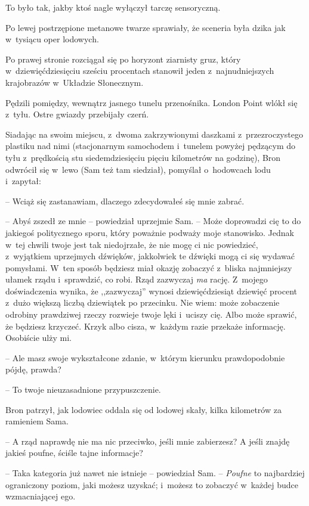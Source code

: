 \documentclass[oneside,polish,11pt,rmheadings]{mwbk}
\begin{document}
\bigskip

To było tak, jakby ktoś nagle wyłączył tarczę sensoryczną. 

Po lewej postrzępione metanowe twarze sprawiały, że sceneria była dzika jak w~tysiącu oper lodowych. 

Po prawej stronie rozciągał się po horyzont ziarnisty gruz, który w~dziewięćdziesięciu sześciu procentach stanowił jeden z~najnudniejszych krajobrazów w~Układzie Słonecznym. 

Pędzili pomiędzy, wewnątrz jasnego tunelu przenośnika. London Point wlókł się z~tyłu. Ostre gwiazdy przebijały czerń. 

Siadając na swoim miejscu, z~dwoma zakrzywionymi daszkami z~przezroczystego plastiku nad nimi (stacjonarnym samochodem i~tunelem powyżej pędzącym do tyłu z~prędkością stu siedemdziesięciu pięciu kilometrów na godzinę), Bron odwrócił się w~lewo (Sam też tam siedział), pomyślał o~hodowcach lodu i~zapytał: 

-- Wciąż się zastanawiam, dlaczego zdecydowałeś się mnie zabrać. 

-- Abyś zszedł ze mnie -- powiedział uprzejmie Sam.  -- Może doprowadzi cię to do jakiegoś politycznego sporu, który poważnie podważy moje stanowisko. Jednak w~tej chwili twoje jest tak niedojrzałe, że nie mogę ci nic powiedzieć, z~wyjątkiem uprzejmych dźwięków, jakkolwiek te dźwięki mogą ci się wydawać pomysłami. W~ten sposób będziesz miał okazję zobaczyć z~bliska najmniejszy ułamek rządu i~sprawdzić, co robi. Rząd zazwyczaj \textit{ma } rację. Z~mojego doświadczenia wynika, że ,,zazwyczaj'' wynosi dziewięćdziesiąt dziewięć procent z~dużo większą liczbą dziewiątek po przecinku. Nie wiem: może zobaczenie odrobiny prawdziwej rzeczy rozwieje twoje lęki i~uciszy cię. Albo może sprawić, że będziesz krzyczeć. Krzyk albo cisza, w~każdym razie przekaże informację. Osobiście ulży mi. 

-- Ale masz swoje wykształcone zdanie, w~którym kierunku prawdopodobnie pójdę, prawda? 

-- To twoje nieuzasadnione przypuszczenie. 

Bron patrzył, jak lodowiec oddala się od lodowej skały, kilka kilometrów za ramieniem Sama. 

-- A rząd naprawdę nie ma nic przeciwko, jeśli mnie zabierzesz? A jeśli znajdę jakieś poufne, ściśle tajne informacje? 

-- Taka kategoria już nawet nie istnieje -- powiedział Sam.  -- \textit{Poufne } to najbardziej ograniczony poziom, jaki możesz uzyskać; i~możesz to zobaczyć w~każdej budce wzmacniającej ego. 
\end{document}
